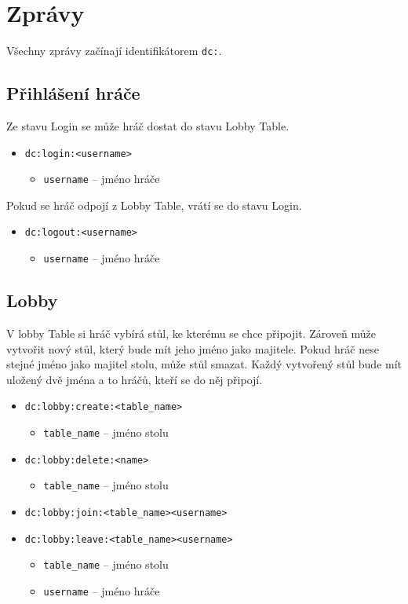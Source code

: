 \documentclass[12pt, a4paper]{article}
\begin{document}
\section{Zprávy}
Všechny zprávy začínají identifikátorem \texttt{dc:}.
\subsection{Přihlášení hráče}
Ze stavu Login se může hráč dostat do stavu Lobby Table.
\begin{itemize}
    \item \texttt{dc:login:<username>}
    \begin{itemize}
        \item \texttt{username} -- jméno hráče
    \end{itemize}
\end{itemize}

Pokud se hráč odpojí z Lobby Table, vrátí se do stavu Login.
\begin{itemize}
    \item \texttt{dc:logout:<username>}
    \begin {itemize}
        \item \texttt{username} -- jméno hráče
    \end{itemize}
\end{itemize}

\subsection{Lobby}
V lobby Table si hráč vybírá stůl, ke kterému se chce připojit. 
Zároveň může vytvořit nový stůl, který bude mít jeho jméno jako majitele.
Pokud hráč nese stejné jméno jako majitel stolu, může stůl smazat.
Každý vytvořený stůl bude mít uložený dvě jména a to hráčů, kteří se do něj připojí.
\begin{itemize}
    \item \texttt{dc:lobby:create:<table\_name>}
    \begin{itemize}
        \item \texttt{table\_name} -- jméno stolu
    \end{itemize}
    \item \texttt{dc:lobby:delete:<name>}
    \begin{itemize}
        \item \texttt{table\_name} -- jméno stolu
        \end{itemize}
    \item \texttt{dc:lobby:join:<table\_name><username>}
    \item \texttt{dc:lobby:leave:<table\_name><username>}
    \begin{itemize}
        \item \texttt{table\_name} -- jméno stolu
        \item \texttt{username} -- jméno hráče
    \end{itemize}
\end{itemize}
\end{document}
